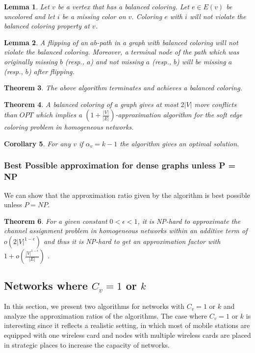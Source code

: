 \documentclass[titlepage, 11pt]{article}
\newtheorem{theorem}{Theorem}
\newtheorem{lemma}[theorem]{Lemma}
\newtheorem{corollary}[theorem]{Corollary}
\begin{document}
\begin{lemma}\label{missing}
Let $v$ be a vertex that has a balanced coloring. Let $e \in E(v)$ be uncolored and let $i$ be a missing color on $v$. Coloring $e$ with $i$ will not violate the balanced coloring property at $v$. 
\end{lemma}

\begin{lemma}\label{flipping}
A flipping of an $ab$-path in a graph with balanced coloring will not violate the balanced coloring.
Moreover, a terminal node of the path which was originally missing $b$ (resp., $a$) and not missing $a$ (resp., $b$)
will be missing $a$ (resp., $b$) after flipping.
\end{lemma}

\begin{theorem}\label{mainthm}
The above algorithm terminates and achieves a balanced coloring.
\end{theorem}

\begin{theorem}\label{approxfactor}
A balanced coloring of a graph gives at most $2|V|$ more conflicts than $OPT$ which implies a $(1 + \frac{|V|}{|E|})$-approximation algorithm for the soft edge coloring problem in homogeneous networks.
\end{theorem}

\begin{corollary}
For any $v$ if $\alpha_v = k-1$  the algorithm gives an optimal solution.
\end{corollary}


\subsubsection{Best Possible approximation for dense graphs unless P = NP}
\label{sec:best}
 We can show that the approximation ratio given by the algorithm 
is best possible unless $P=NP$. 
\begin{theorem}
For a given constant $0 < \epsilon< 1$, it is NP-hard to approximate the channel assignment problem  in homogeneous networks 
within an additive term of $o(2|V|^{1- \epsilon})$ and thus it is NP-hard to get an approximation factor with $1 + o(\frac{|V|^{1- \epsilon}}{|E|})$ .
\label{theorem:inapprox}
\end{theorem}

\subsection{Networks where $C_v = 1$ or $k$}
\label{sec:het}
In this section, 
we present two algorithms for networks with $C_v = 1$ or $k$
 and analyze the approximation ratios of the algorithms.
The case where $C_v = 1$ or $k$ is interesting since 
 it reflects a realistic setting, in which 
most of mobile stations are equipped with one wireless card and 
nodes with multiple wireless cards are placed in strategic places
to increase the capacity of networks.
\end{document}
